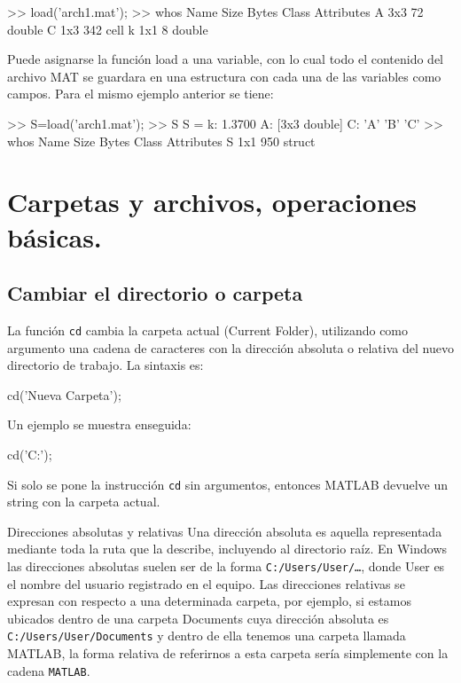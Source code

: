 \begin{matlab}
>> load('arch1.mat');
>> whos %
  Name      Size            Bytes  Class     Attributes
  A         3x3                72  double              
  C         1x3               342  cell                
  k         1x1                 8  double       
\end{matlab}

Puede asignarse la función load a una variable, con lo cual todo el
contenido del archivo MAT se guardara en una estructura con cada una de
las variables como campos. Para el mismo ejemplo anterior se tiene:

\begin{matlab}
>> S=load('arch1.mat');
>> S
S = 
    k: 1.3700
    A: [3x3 double]
    C: {'A'  'B'  'C'}
>> whos 
  Name      Size            Bytes  Class     Attributes
  S         1x1               950  struct       
\end{matlab}

\section{Carpetas y archivos, operaciones básicas.}

\subsection{Cambiar el directorio o carpeta}

La función \texttt{cd} cambia la carpeta actual (Current Folder),
utilizando como argumento una cadena de caracteres con la dirección
absoluta o relativa del nuevo directorio de trabajo. La sintaxis es:

\begin{matlab}
cd('Nueva Carpeta');
\end{matlab}

Un ejemplo se muestra enseguida:

\begin{matlab}
cd('C:\Users\User\Documents\MATLAB');
\end{matlab}

Si solo se pone la instrucción \texttt{cd} sin argumentos, entonces
MATLAB devuelve un string con la carpeta actual. \\

\begin{informacion}{Direcciones absolutas y relativas}
Una dirección absoluta es aquella representada mediante
toda la ruta  que la describe, incluyendo al directorio
raíz. En Windows las  direcciones absolutas suelen ser de
la forma \texttt{C:/Users/User/\ldots{}}, donde  User es
el nombre del usuario registrado en el equipo. Las direcciones
 relativas se expresan con respecto a una determinada
carpeta, por  ejemplo, si estamos ubicados dentro de una
carpeta Documents cuya  dirección absoluta es
\texttt{C:/Users/User/Documents} y dentro de ella 
tenemos una carpeta llamada MATLAB, la forma relativa de referirnos a
 esta carpeta sería simplemente con la cadena
\texttt{MATLAB}.
\end{informacion}

